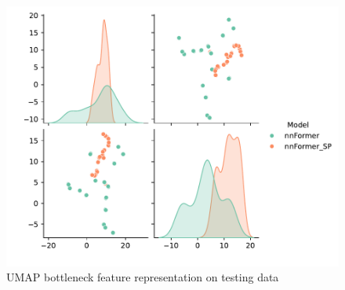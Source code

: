 \begin{figure}[htb!]  %
    \centering
	\centering
	\includegraphics[width=1\textwidth]{images/Umap_test.pdf}
	\caption{\centering UMAP bottleneck feature representation on testing data}
	\label{Fig:umap test}
\end{figure}


